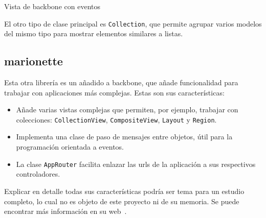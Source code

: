 \documentclass[main]{subfiles}
\begin{document}
\begin{listing}
  \caption[Vista de Backbone.js con eventos]{Vista de \gls{backbone} con eventos}
  \label{lst:backbone-view}
\end{listing}

El otro tipo de clase principal es \texttt{Collection}, que permite agrupar varios modelos del mismo tipo para mostrar elementos similares a listas.

\subsection[Marionette.js]{\Gls{marionette}}

Esta otra librería es un añadido a \gls{backbone}, que añade funcionalidad para trabajar con aplicaciones más complejas. Estas son sus características:

\begin{itemize}
  \item Añade varias vistas complejas que permiten, por ejemplo, trabajar con colecciones: \texttt{CollectionView}, \texttt{CompositeView}, \texttt{Layout} y \texttt{Region}.
  \item Implementa una clase de paso de mensajes entre objetos, útil para la programación orientada a eventos.
  \item La clase \texttt{AppRouter} facilita enlazar las \glspl{url} de la aplicación a sus respectivos controladores.
\end{itemize}

Explicar en detalle todas sus características podría ser tema para un estudio completo, lo cual no es objeto de este proyecto ni de su memoria. Se puede encontrar más información en su web~\autocite{marionette}.
\end{document}
